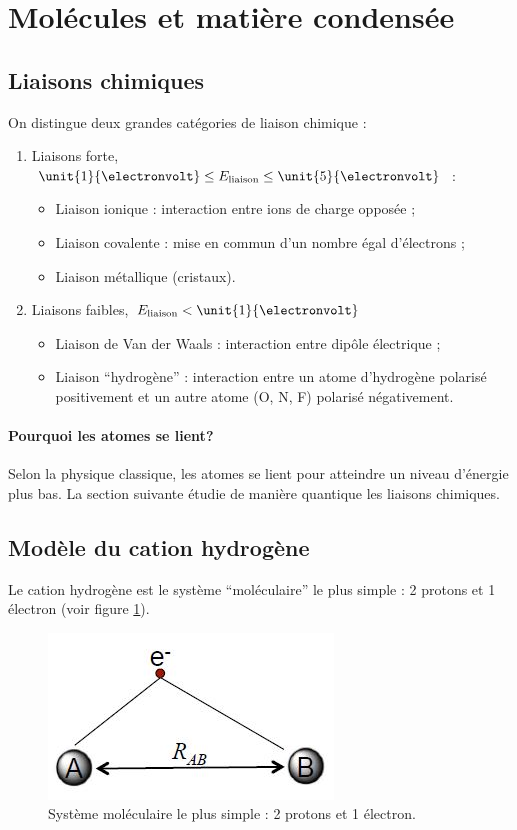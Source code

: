 
\section{Molécules et matière condensée}
\subsection{Liaisons chimiques}
On distingue deux grandes catégories de
liaison chimique :
\begin{enumerate}
	\item Liaisons forte, $\unit{1}{\electronvolt} \leq E_{\text{liaison}} \leq \unit{5}{\electronvolt}$ :
	\begin{itemize}
		\item Liaison ionique : interaction entre ions de charge opposée ;
		\item Liaison covalente : mise en commun d'un nombre égal d'électrons ;
		\item Liaison métallique (cristaux).
	\end{itemize}
	\item Liaisons faibles, $E_{\text{liaison}} < \unit{1}{\electronvolt}$
	\begin{itemize}
		\item Liaison de Van der Waals : interaction entre dipôle électrique ;
		\item Liaison ``hydrogène'' : interaction entre un atome d'hydrogène polarisé
		positivement et un autre atome (O, N, F) polarisé négativement.
	\end{itemize}
\end{enumerate}

\paragraph{Pourquoi les atomes se lient?}
Selon la physique classique, les atomes se lient
pour atteindre un niveau d'énergie plus bas.
La section suivante étudie de manière quantique
les liaisons chimiques.

\subsection{Modèle du cation hydrogène}
Le cation hydrogène est le système ``moléculaire''
le plus simple : 2 protons et 1 électron (voir figure 
\ref{fig:cation-h2}).

\begin{figure}[ht]
	\centering
	\includegraphics{img/cation_h2.jpg}
	\caption{Système moléculaire le plus simple : 2 protons
	et 1 électron.}
	\label{fig:cation-h2}
\end{figure}

